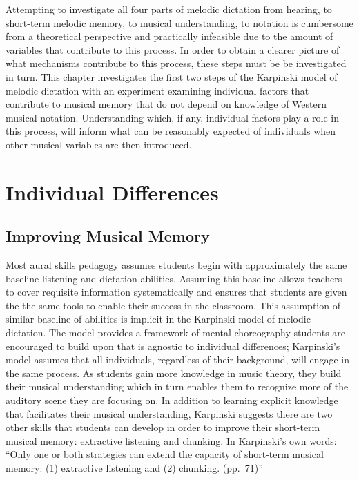 \documentclass[12pt,]{book}
\begin{document}
Attempting to investigate all four parts of melodic dictation from hearing, to short-term melodic memory, to musical understanding, to notation is cumbersome from a theoretical perspective and practically infeasible due to the amount of variables that contribute to this process.
In order to obtain a clearer picture of what mechanisms contribute to this process, these steps must be be investigated in turn.
This chapter investigates the first two steps of the Karpinski model of melodic dictation \citep{karpinskiAuralSkillsAcquisition2000, karpinskiModelMusicPerception1990} with an experiment examining individual factors that contribute to musical memory that do not depend on knowledge of Western musical notation.
Understanding which, if any, individual factors play a role in this process, will inform what can be reasonably expected of individuals when other musical variables are then introduced.

\hypertarget{individual-differences-1}{%
\section{Individual Differences}\label{individual-differences-1}}

\hypertarget{improving-musical-memory}{%
\subsection{Improving Musical Memory}\label{improving-musical-memory}}

Most aural skills pedagogy assumes students begin with approximately the same baseline listening and dictation abilities.
Assuming this baseline allows teachers to cover requisite information systematically and ensures that students are given the the same tools to enable their success in the classroom.
This assumption of similar baseline of abilities is implicit in the Karpinski model of melodic dictation.
The model provides a framework of mental choreography students are encouraged to build upon that is agnostic to individual differences; Karpinski's model assumes that all individuals, regardless of their background, will engage in the same process.
As students gain more knowledge in music theory, they build their musical understanding which in turn enables them to recognize more of the auditory scene they are focusing on.
In addition to learning explicit knowledge that facilitates their musical understanding, Karpinski suggests there are two other skills that students can develop in order to improve their short-term musical memory: extractive listening and chunking.
In Karpinski's own words: ``Only one or both strategies can extend the capacity of short-term musical memory: (1) extractive listening and (2) chunking. (pp.~71)''
\end{document}

